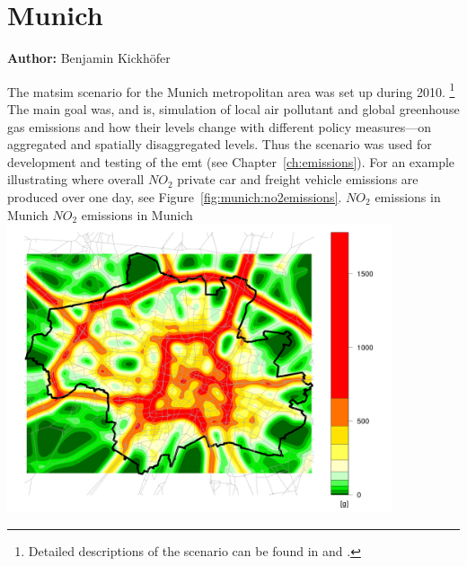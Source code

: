\section{Munich}
\label{sec:munich}
\hfill \textbf{Author:} Benjamin Kickhöfer


The \gls{matsim} scenario for the Munich metropolitan area was set up during 2010.%
%
\footnote{
%
Detailed descriptions of the scenario can be found in \citet{KickhoeferEtAl_VanoutriveVerhetsel_2013} and \citet{Kickhoefer_PhDThesis_2014}.
%
}
%
The main goal was, and is, simulation of local air pollutant and global greenhouse gas emissions and how their levels change with different policy measures---on aggregated and spatially disaggregated levels. Thus the scenario was used for development and testing of the \gls{emt} (see Chapter~\ref{ch:emissions}). For an example illustrating where overall $\mathit{NO_2}$ private car and freight vehicle emissions are produced over one day, see Figure~\ref{fig:munich:no2emissions}.
%
\createfigure%
{$\mathit{NO_2}$ emissions in Munich}%
{$\mathit{NO_2}$ emissions in Munich}%
{\label{fig:munich:no2emissions}}%
{\includegraphics[width=0.85\textwidth, angle=0]{./using/figures/baseCase_1500_NO2_g_108000_0.png}}%
{}

